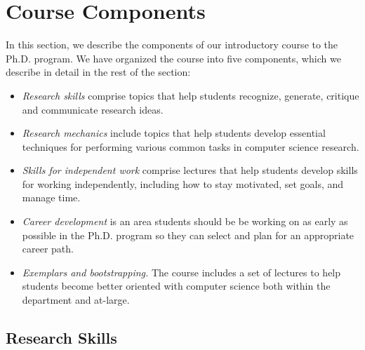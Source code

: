 \section{Course Components}\label{sec:components}

In this section, we describe the components of our introductory course
to the Ph.D. program.  We have organized the course into five
components, which we describe in detail in the rest of the section:

\begin{itemize}
\itemsep=-1pt
\item {\em Research skills} comprise topics that help students
  recognize, generate, critique and communicate research ideas.
\item {\em Research mechanics} include topics that help students develop
  essential techniques for performing various common tasks in computer
  science research.
\item {\em Skills for independent work} comprise lectures that help
  students develop skills for working independently, including how to stay
  motivated, set goals, and manage time.
\item {\em Career development} is an area students should be be working
  on as early as possible in the Ph.D. program so they can select and
  plan for an appropriate career path.
\item {\em Exemplars and bootstrapping.} The course includes a set of
  lectures to help students become better oriented with computer science
  both within the department and at-large.
\end{itemize}

\subsection{Research Skills}

